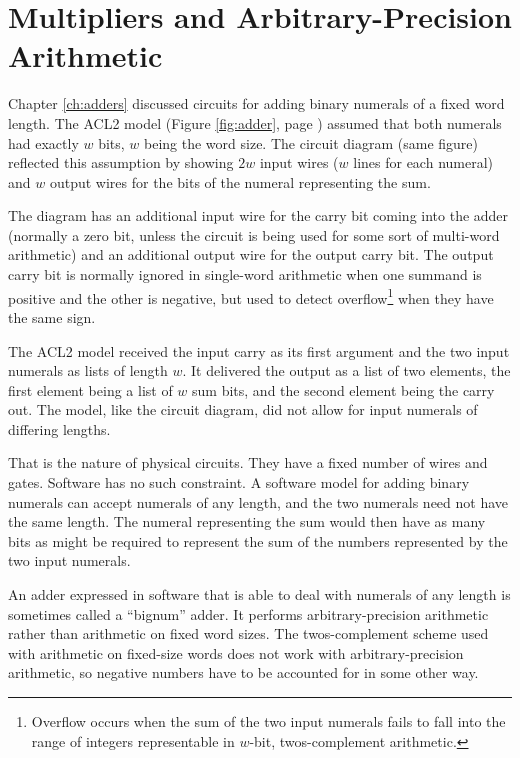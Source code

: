 \chapter{Multipliers and Arbitrary-Precision Arithmetic}
\label{ch:multipliers}


Chapter \ref{ch:adders} discussed circuits for adding binary numerals of a
fixed word length.
The ACL2 model (Figure \ref{fig:adder}, page \pageref{fig:adder})
assumed that both numerals had exactly $w$ bits, $w$ being the word size.
The circuit diagram (same figure) reflected this assumption by
showing $2w$ input wires ($w$ lines for each numeral) and
$w$ output wires for the bits of the numeral representing the sum.

The diagram has an additional input wire for the carry bit
coming into the adder (normally a zero bit, unless the circuit is being
used for some sort of multi-word arithmetic) and an additional output wire
for the output carry bit. The output carry bit is normally ignored in single-word arithmetic when one summand is positive and the other is negative,
but used to detect overflow\footnote{Overflow occurs
when the sum of the two input numerals fails
to fall into the range of integers representable in $w$-bit, twos-complement
arithmetic.}
when they have the same sign.

The ACL2 model received the input carry as its first argument
and the two input numerals as lists of length $w$.
It delivered the output as a list of two elements,
the first element being a list of $w$ sum bits,
and the second element being the carry out.
The model, like the circuit diagram, did not allow for input numerals
of differing lengths.

That is the nature of physical circuits.
They have a fixed number of wires and gates.
Software has no such constraint.
A software model for adding binary numerals can accept
numerals of any length, and the two numerals need not have the same length.
The numeral representing the sum would then have as many bits as
might be required to represent the sum of the numbers
represented by the two input numerals.

An adder expressed in software that is able to deal with numerals
of any length is sometimes called a ``bignum'' adder.
It performs arbitrary-precision arithmetic
rather than arithmetic on fixed word sizes.
The twos-complement scheme used with arithmetic on fixed-size words
does not work with arbitrary-precision arithmetic, so negative numbers
have to be accounted for in some other way.


